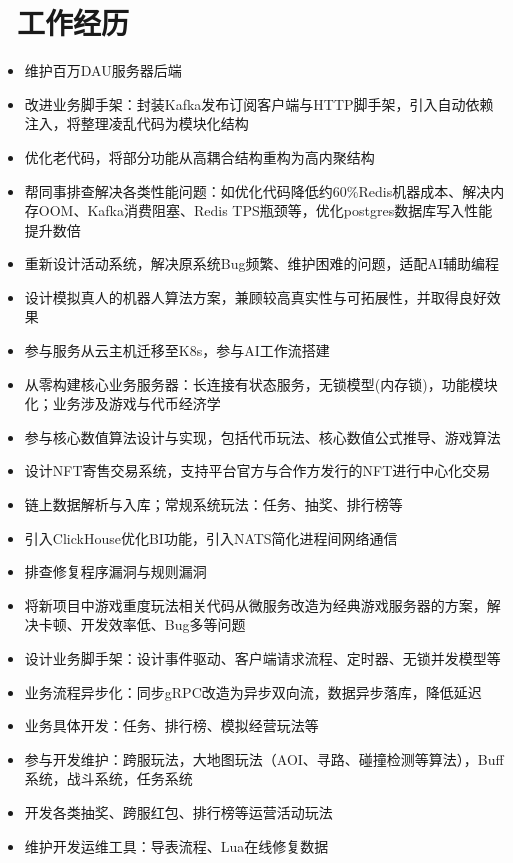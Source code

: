\documentclass{resume}
\begin{document}
\section{\faBriefcase\ 工作经历}
\begin{itemize}
  \item 维护百万DAU服务器后端
  \item 改进业务脚手架：封装Kafka发布订阅客户端与HTTP脚手架，引入自动依赖注入，将整理凌乱代码为模块化结构
  \item 优化老代码，将部分功能从高耦合结构重构为高内聚结构
  \item 帮同事排查解决各类性能问题：如优化代码降低约60\%Redis机器成本、解决内存OOM、Kafka消费阻塞、Redis TPS瓶颈等，优化postgres数据库写入性能提升数倍
  \item 重新设计活动系统，解决原系统Bug频繁、维护困难的问题，适配AI辅助编程
  \item 设计模拟真人的机器人算法方案，兼顾较高真实性与可拓展性，并取得良好效果
  \item 参与服务从云主机迁移至K8s，参与AI工作流搭建
\end{itemize}
\begin{itemize}
  \item 从零构建核心业务服务器：长连接有状态服务，无锁模型(内存锁)，功能模块化；业务涉及游戏与代币经济学
  \item 参与核心数值算法设计与实现，包括代币玩法、核心数值公式推导、游戏算法
  \item 设计NFT寄售交易系统，支持平台官方与合作方发行的NFT进行中心化交易
  \item 链上数据解析与入库；常规系统玩法：任务、抽奖、排行榜等
  \item 引入ClickHouse优化BI功能，引入NATS简化进程间网络通信
  \item 排查修复程序漏洞与规则漏洞
\end{itemize}
\begin{itemize}
  \item 将新项目中游戏重度玩法相关代码从微服务改造为经典游戏服务器的方案，解决卡顿、开发效率低、Bug多等问题
  \item 设计业务脚手架：设计事件驱动、客户端请求流程、定时器、无锁并发模型等
  \item 业务流程异步化：同步gRPC改造为异步双向流，数据异步落库，降低延迟
  \item 业务具体开发：任务、排行榜、模拟经营玩法等
\end{itemize}
\begin{itemize}
  \item 参与开发维护：跨服玩法，大地图玩法（AOI、寻路、碰撞检测等算法），Buff系统，战斗系统，任务系统
  \item 开发各类抽奖、跨服红包、排行榜等运营活动玩法
  \item 维护开发运维工具：导表流程、Lua在线修复数据
\end{itemize}
\end{document}
